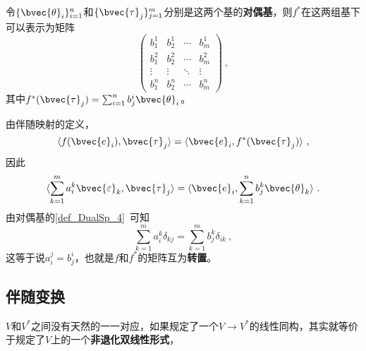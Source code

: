 令$\{\bvec{\theta}_i\}_{i=1}^n$和$\{\bvec{\tau}_j\}_{j=1}^m$分别是这两个基的\textbf{对偶基}，则$f^*$在这两组基下可以表示为矩阵
\begin{equation}
\begin{pmatrix}
b^1_1&b^1_2&\cdots&b^1_m\\
b^2_1&b^2_2&\cdots&b^2_m\\
\vdots&\vdots&\ddots&\vdots\\
b^n_1&b^n_2&\cdots&b^n_m
\end{pmatrix}~, 
\end{equation}
其中$f^*(\bvec{\tau}_j)=\sum_{i=1}^n b^i_j\bvec{\theta}_i$。

由伴随映射的定义，
\begin{equation}
\langle f(\bvec{e}_i), \bvec{\tau}_j \rangle =\langle \bvec{e}_i, f^*(\bvec{\tau}_j) \rangle ~, 
\end{equation}
因此
\begin{equation}
\langle \sum_{k=1}^m a^k_i\bvec{\varepsilon}_k, \bvec{\tau}_j \rangle =\langle \bvec{e}_i, \sum_{k=1}^n b^k_j\bvec{\theta}_k \rangle ~. 
\end{equation}
由对偶基的\autoref{def_DualSp_4}~可知
\begin{equation}
\sum_{k=1}^m a^k_i\delta_{kj} = \sum_{k=1}^m b^k_j\delta_{ik}~, 
\end{equation}
这等于说$a^j_i=b^i_j$，也就是$f$和$f^*$的矩阵互为\textbf{转置}。






\subsection{伴随变换}



$V$和$V^*$之间没有天然的一一对应，如果规定了一个$V\to V^*$的线性同构，其实就等价于规定了$V$上的一个\textbf{非退化双线性形式}，























